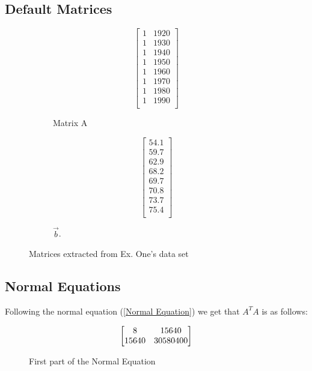 \documentclass[letterpaper, conference]{IEEEtran}
\begin{document}
			\subsection{Default Matrices}
					\begin{figure}[H]
						\centering
						\begin{subfigure}{.2\textwidth}
							\centering
							\[
							\begin{bmatrix}
							1 & 1920 \\
							1 & 1930 \\
							1 & 1940 \\
							1 & 1950 \\
							1 & 1960 \\
							1 & 1970 \\
							1 & 1980 \\
							1 & 1990 \\
							\end{bmatrix}
							\]
							\caption{Matrix A}
							\label{matrixA_1}
						\end{subfigure}
						\begin{subfigure}{.2\textwidth}
							\centering
							\[
							\begin{bmatrix}
							54.1 \\
							59.7 \\
							62.9 \\
							68.2 \\
							69.7 \\
							70.8 \\
							73.7 \\
							75.4 \\
							\end{bmatrix}
							\]
							\caption{$\vec{b}$.}
							\label{matrixb_1}
						\end{subfigure}
					\caption{Matrices extracted from Ex. One's data set}
					\end{figure}
			\subsection{Normal Equations}
			Following the normal equation (\ref{Normal Equation}) we get that $A^TA$ is as follows:
			\begin{figure}[H]
				\centering
				\[
				\centering
				\left[
				\begin{matrix}
				8 & 15640\\
				15640 & 30580400
				\end{matrix}
				\right]
				\]
				\caption{First part of the Normal Equation}
				\label{ATA_1}
			\end{figure}
			
\end{document}
